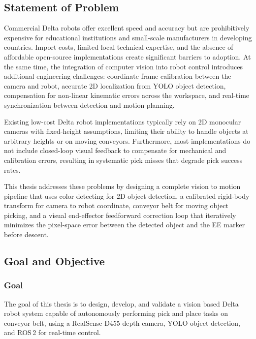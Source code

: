 \subsection{Statement of Problem}
\hspace{1.27cm}
Commercial Delta robots offer excellent speed and accuracy but are prohibitively expensive for educational institutions and small-scale manufacturers in developing countries. Import costs, limited local technical expertise, and the absence of affordable open-source implementations create significant barriers to adoption. At the same time, the integration of computer vision into robot control introduces additional engineering challenges: coordinate frame calibration between the camera and robot, accurate 2D localization from YOLO object detection, compensation for non-linear kinematic errors across the workspace, and real-time synchronization between detection and motion planning.

\par
\hspace{1.27cm}
Existing low-cost Delta robot implementations typically rely on 2D monocular cameras with fixed-height assumptions, limiting their ability to handle objects at arbitrary heights or on moving conveyors. Furthermore, most implementations do not include closed-loop visual feedback to compensate for mechanical and calibration errors, resulting in systematic pick misses that degrade pick success rates.

\par
\hspace{1.27cm}
This thesis addresses these problems by designing a complete vision to motion pipeline that uses color detecting for 2D object detection, a calibrated rigid-body transform for camera to robot coordinate, conveyor belt for moving object picking, and a visual end-effector feedforward correction loop that iteratively minimizes the pixel-space error between the detected object and the EE marker before descent.

\subsection{Goal and Objective}
\subsubsection{Goal}
\hspace{1.27cm}
The goal of this thesis is to design, develop, and validate a vision based Delta robot system capable of autonomously performing pick and place tasks on conveyor belt, using a RealSense D455 depth camera, YOLO object detection, and ROS\,2 for real-time control.

